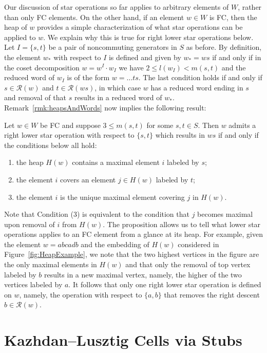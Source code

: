 \documentclass[ALCO,Unicode,published]{cedram}
\newcommand{\calr}{\mathcal{R}}
\begin{document}
\noindent
Our discussion of star operations so far applies to arbitrary elements of $W$, rather than only FC elements. On the
other hand, if an element $w\in W$ is FC, then the heap of $w$ provides a simple characterization of what star
operations can be applied to $w$. We explain why this is true for right lower star operations below. Let
$I=\{s,t\}$ be a pair of noncommuting generators in $S$ as before. By definition, the element $w_*$ with respect to
$I$ is defined and given by $w_*=ws$ if and only if in the coset decomposition $w=w^I\cdot w_I$ we have $2 \le
l(w_I)< m(s,t)$ and the reduced word of $w_I$ is of the form  $w=\dots ts$. The last condition holds if and only if
$s \in\calr(w)$ and $t\in \calr(ws)$, in which case $w$ has a reduced word ending in $s$ and removal of that $s$
results in a reduced word of $w_*$. Remark~\ref{rmk:heapsAndWords} now implies the following result:
\begin{prop}
    \label{prop:Reducibility} Let $w\in W$ be FC and suppose $3\le m(s,t)$ for some $s,t\in S$.  Then $w$ admits a
          right lower star operation with respect to $\{s,t\}$ which results in $ws$ if and only if the conditions
          below all hold:
    \begin{enumerate}
        \item the heap $H(w)$ contains a maximal element $i$ labeled by $s$;
        \item the element $i$ covers an element $j\in H(w)$ labeled by $t$;
        \item the element $i$ is the unique maximal element covering $j$ in $H(w)$.
    \end{enumerate}
\end{prop}

\noindent 
Note that Condition (3) is equivalent to the condition that $j$ becomes maximal upon removal of $i$ from $H(w)$.
The proposition allows us to tell what lower star operations applies to an FC element from a glance at its heap.
For example, given the element $w=abcadb$ and the embedding of $H(w)$ considered in Figure~\ref{fig:HeapExample},
we note that the two highest vertices in the figure are the only maximal elements in $H(w)$ and that only the
removal of top vertex labeled by $b$ results in a new maximal vertex, namely, the higher of the two vertices
labeled by $a$. It follows that only one right lower star operation is defined on $w$, namely, the operation with
respect to $\{a,b\}$ that removes the right descent $b\in \calr(w)$. 

\section{Kazhdan--Lusztig Cells via Stubs}
\label{KLcells}
\end{document}
